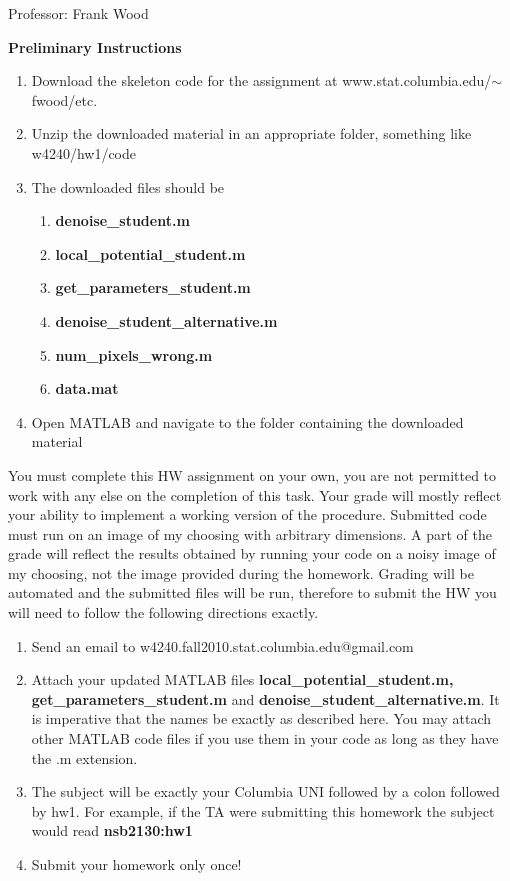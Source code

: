 \documentclass[12pt]{article}
\begin{document}

\begin{center}
	Professor: Frank Wood
\end{center}


{\bf Preliminary Instructions}
\begin{enumerate}
	\item Download the skeleton code for the assignment at www.stat.columbia.edu/$\sim$fwood/etc.
	\item Unzip the downloaded material in an appropriate folder, something like w4240/hw1/code
	\item { The downloaded files should be
		 \begin{enumerate}
			\item {\bf denoise\_student.m}
			\item {\bf local\_potential\_student.m}
			\item {\bf get\_parameters\_student.m}
			\item {\bf denoise\_student\_alternative.m}
			\item{\bf num\_pixels\_wrong.m}
			\item {\bf data.mat}
		\end{enumerate}
	}
	\item Open MATLAB and navigate to the folder containing the downloaded material
\end{enumerate}

You must complete this HW assignment on your own, you are not permitted to work with any else on the completion of this task.  Your grade will mostly reflect your ability to implement a working version of the procedure.  Submitted code must run on an image of my choosing with arbitrary dimensions.  A part of the grade will reflect the results obtained by running your code on a noisy image of my choosing, not the image provided during the homework.  Grading will be automated and the submitted files will be run, therefore to submit the HW you will need to follow the following directions exactly.

\begin{enumerate}
	\item Send an email to w4240.fall2010.stat.columbia.edu@gmail.com
	\item Attach your updated MATLAB files {\bf local\_potential\_student.m, get\_parameters\_student.m} and {\bf denoise\_student\_alternative.m}.  It is imperative that the names be exactly as described here.  You may attach other MATLAB code files if you use them in your code as long as they have the .m extension.
	\item The subject will be exactly your Columbia UNI followed by a colon followed by hw1.  For example, if the TA were submitting this homework the subject would read {\bf nsb2130:hw1}
	\item Submit your homework only once!
\end{enumerate}
\end{document}

